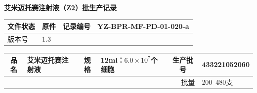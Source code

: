 \documentclass[UTF8,10pt,a4paper,fontset=fandol]{ctexart}
\newcommand{\fieldvalue}[1]{#1}
\newcommand{\handwritten}[1]{#1}
\begin{document}
\newpage

\begin{center}
\textbf{艾米迈托赛注射液（Z2）批生产记录}
\end{center}

\noindent
\begin{tabularx}{\textwidth}{|l|X|l|X|}
\hline
文件状态 &
\fieldvalue{原件} &
记录编号 &
\fieldvalue{YZ-BPR-MF-PD-01-020-a}
\\
\hline
版本号 &
\fieldvalue{1.3} &
\multicolumn{2}{l|}{} \\
\hline
\end{tabularx}

\vspace{2pt}

\noindent
\begin{tabularx}{\textwidth}{|c|X|c|X|c|X|}
\hline
品名 &
\fieldvalue{艾米迈托赛注射液} &
规格 &
\fieldvalue{12ml：$6.0\times10^{7}$个细胞} &
生产批号 &
\fieldvalue{\handwritten{433221052060}}
\\
\hline
\multicolumn{5}{r|}{批量} &
\fieldvalue{200--480支}
\\
\hline
\end{tabularx}

\vspace{2pt}
\end{document}
